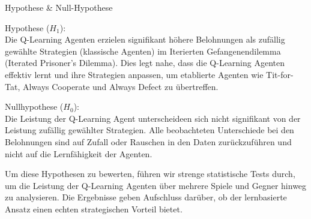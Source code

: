 \documentclass[final]{beamer}
\newlength{\colwidth}
\begin{document}
\begin{frame}[t]
\begin{columns}[t]
\begin{column}{\colwidth}

  \begin{alertblock}{Hypothese \& Null-Hypothese}

    Hypothese ($H_1$): \\
    Die Q-Learning Agenten erzielen signifikant höhere Belohnungen als zufällig gewählte Strategien (klassische Agenten) im Iterierten 
    Gefangenendilemma (Iterated Prisoner's Dilemma). Dies legt nahe, dass die Q-Learning Agenten effektiv lernt und ihre Strategien anpassen, 
    um etablierte Agenten wie Tit-for-Tat, Always Cooperate und Always Defect zu übertreffen.

    Nullhypothese ($H_0$): \\
    Die Leistung der Q-Learning Agent unterscheideen sich nicht signifikant von der Leistung zufällig gewählter Strategien. 
    Alle beobachteten Unterschiede bei den Belohnungen sind auf Zufall oder Rauschen in den Daten zurückzuführen und nicht auf die Lernfähigkeit 
    der Agenten. \newline 

    Um diese Hypothesen zu bewerten, führen wir strenge statistische Tests durch, um die Leistung der Q-Learning Agenten über mehrere 
    Spiele und Gegner hinweg zu analysieren. Die Ergebnisse geben Aufschluss darüber, ob der lernbasierte Ansatz einen echten strategischen 
    Vorteil bietet.

  \end{alertblock}





\end{column}
\end{columns}
\end{frame}
\end{document}

